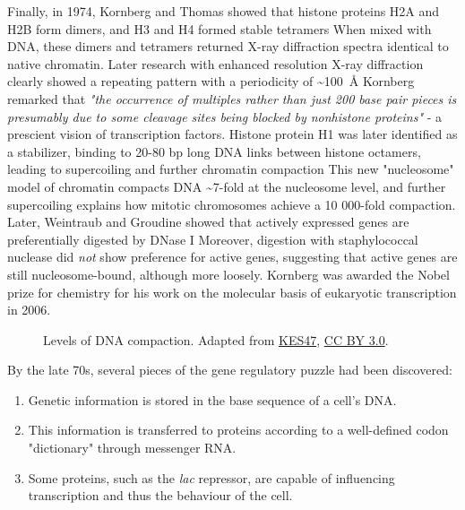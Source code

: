Finally, in 1974, Kornberg and Thomas showed that histone proteins H2A and H2B form dimers, and H3 and H4 formed stable tetramers When mixed with DNA, these dimers and tetramers returned X-ray diffraction spectra identical to native chromatin. Later research with enhanced resolution X-ray diffraction clearly showed a repeating pattern with a periodicity of \textasciitilde{\SI{100}{\angstrom}} Kornberg remarked that \textit{"the occurrence of multiples rather than just 200 base pair pieces is presumably due to some cleavage sites being blocked by nonhistone proteins"} - a prescient vision of transcription factors. Histone protein H1 was later identified as a stabilizer, binding to 20-80 bp long DNA links between histone octamers, leading to supercoiling and further chromatin compaction This new "nucleosome" model of chromatin compacts DNA \textasciitilde{7-fold} at the nucleosome level, and further supercoiling explains how mitotic chromosomes achieve a 10 000-fold compaction. Later, Weintraub and Groudine showed that actively expressed genes are preferentially digested by DNase I Moreover, digestion with staphylococcal nuclease did \textit{not} show preference for active genes, suggesting that active genes are still nucleosome-bound, although more loosely. Kornberg was awarded the Nobel prize for chemistry for his work on the molecular basis of eukaryotic transcription in 2006.

\begin{figure}[ht]
	\centering
	
	\caption[DNA condensation]{Levels of DNA compaction. Adapted from \href{https://commons.wikimedia.org/wiki/File:Chromosome_en.svg}{KES47}, \href{https://creativecommons.org/licenses/by/3.0/}{CC BY 3.0}.}
	\label{fig:dna_condensation}
\end{figure}

By the late 70s, several pieces of the gene regulatory puzzle had been discovered:

\begin{enumerate}[noitemsep]
	\item Genetic information is stored in the base sequence of a cell's DNA.
	\item This information is transferred to proteins according to a well-defined codon "dictionary" through messenger RNA.
	\item Some proteins, such as the \textit{lac} repressor, are capable of influencing transcription and thus the behaviour of the cell.
\end{enumerate}

